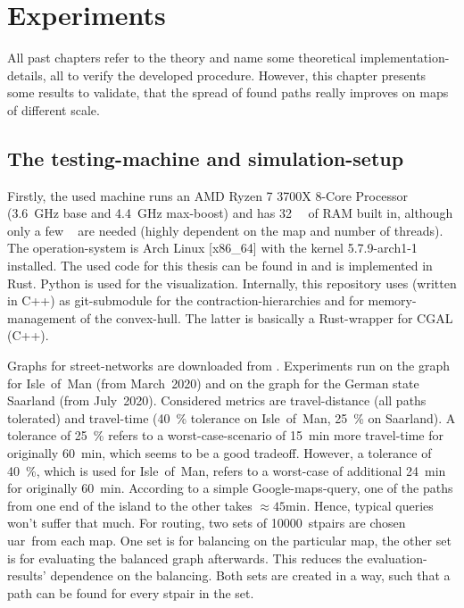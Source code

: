 \chapter{Experiments}
\label{chap:experiments}

All past chapters refer to the theory and name some theoretical implementation-details, all to verify the developed procedure.
However, this chapter presents some results to validate, that the spread of found paths really improves on maps of different scale.

\section{The testing-machine and simulation-setup}

    Firstly, the used machine runs an AMD Ryzen 7 3700X 8-Core Processor (\si{\num{3.6} \giga\hertz} base and \si{\num{4.4} \giga\hertz} max-boost) and has \si{\num{32} \giga\byte} of RAM built in, although only a few \si{\giga\byte} are needed (highly dependent on the map and number of threads).
    The operation-system is Arch Linux [x86\_64] with the kernel 5.7.9-arch1-1 installed.
    The used code for this thesis can be found in \cite{github:dominicparga/osmgraphing} and is implemented in Rust.
    Python is used for the visualization.
    Internally, this repository uses \cite{github:lesstat/multi-ch-constructor} (written in C++) as git-submodule for the \gls{contraction-hierarchies} and \cite{github:lesstat/nd-triangulation} for memory-management of the convex-hull.
    The latter is basically a Rust-wrapper for CGAL (C++).

    Graphs for street-networks are downloaded from \cite{osm}.
    Experiments run on the graph for Isle~of~Man (from March~2020) and on the graph for the German state Saarland (from July~2020).
    Considered \glspl{metric} are travel-distance (all paths tolerated) and travel-time (\si{40 \percent} tolerance on Isle~of~Man, \si{25 \percent} on Saarland).
    A tolerance of \si{25 \percent} refers to a worst-case-scenario of \si{15 \minute} more travel-time for originally \si{60 \minute}, which seems to be a good tradeoff.
    However, a tolerance of \si{40 \percent}, which is used for Isle~of~Man, refers to a worst-case of additional \si{24 \minute} for originally \si{60 \minute}.
    According to a simple Google-maps-query, one of the paths from one end of the island to the other takes $\approx \si{45 \minute}$.
    Hence, typical queries won't suffer that much.
    For routing, two sets of \num{10000}~\glspl{stpair} are chosen \gls{uar}\ from each map.
    One set is for \gls{balancing} on the particular map, the other set is for evaluating the balanced graph afterwards.
    This reduces the evaluation-results' dependence on the \gls{balancing}.
    Both sets are created in a way, such that a path can be found for every \gls{stpair} in the set.

